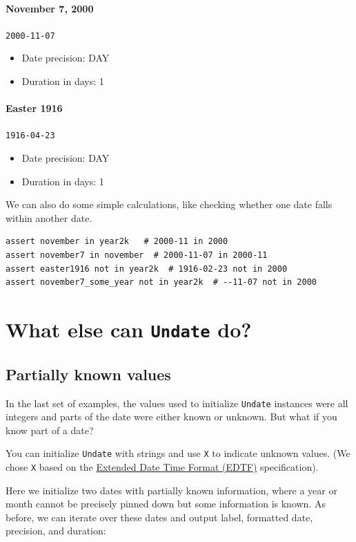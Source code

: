 \documentclass{anthology-ch}         %
\begin{document}
\paragraph{November 7, 2000} \texttt{2000-11-07}
\begin{itemize}
    \item Date precision: DAY
    \item Duration in days: 1
\end{itemize}

\paragraph{Easter 1916} \texttt{1916-04-23}
\begin{itemize}
    \item Date precision: DAY
    \item Duration in days: 1
\end{itemize}

We can also do some simple calculations, like checking whether one date falls within another date.
\begin{verbatim}
assert november in year2k   # 2000-11 in 2000
assert november7 in november  # 2000-11-07 in 2000-11
assert easter1916 not in year2k  # 1916-02-23 not in 2000
assert november7_some_year not in year2k  # --11-07 not in 2000
\end{verbatim}

\section{What else can \texttt{Undate} do?}

\subsection{Partially known values}

In the last set of examples, the values used to initialize \texttt{Undate} instances were all integers and parts of the date were either known or unknown. But what if you know part of a
date?

You can initialize \texttt{Undate} with strings and use \texttt{X} to
indicate unknown values.  (We chose \texttt{X} based on the \href{https://www.loc.gov/standards/datetime/}{Extended Date Time Format (EDTF)} specification).

Here we initialize two dates with partially known information, where a year or month cannot be precisely pinned down but some information is known. As before, we can iterate over these dates
and output label, formatted date, precision, and duration:
\end{document}
